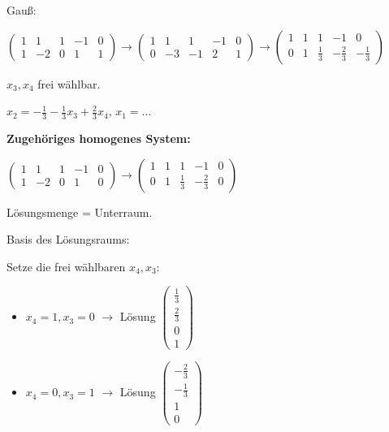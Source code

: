\documentclass[a4paper, openany]{book}
\begin{document}
    Gauß:


    \par \medskip

    $\begin{pmatrix}1 & 1 & 1 & -1 & 0 \\ 1 & -2 & 0 & 1 & 1 \end{pmatrix} \rightarrow \begin{pmatrix}1 & 1 & 1 & -1 & 0 \\ 0 & -3 & -1 & 2 & 1 \end{pmatrix} \rightarrow \begin{pmatrix}1 & 1 & 1 & -1 & 0 \\ 0 & 1 & \frac{1}{3} & - \frac{2}{3} & - \frac{1}{3} \end{pmatrix}$

    \par \medskip

    $x_3, x_4$ frei wählbar.

    $x_2 = - \frac{1}{3} - \frac{1}{3} x_3 + \frac{2}{3} x_4$, $x_1 = ...$

    \par \medskip

    \textbf{Zugehöriges homogenes System:}

    \par \medskip

    $\begin{pmatrix}1 & 1 & 1 & -1 & 0 \\ 1 & -2 & 0 & 1 & 0 \end{pmatrix} \rightarrow \begin{pmatrix}1 & 1 & 1 & -1 & 0 \\ 0 & 1 & \frac{1}{3} & - \frac{2}{3} & 0 \end{pmatrix}$

    \par \medskip

    Lösungsmenge = Unterraum.

    Basis des Lösungsraums:

    Setze die frei wählbaren $x_4, x_3:$

    \begin{itemize}
      \item $x_4 = 1, x_3 = 0$ $\rightarrow$ Lösung $\begin{pmatrix}\frac{1}{3} \\ \frac{2}{3} \\ 0 \\ 1 \end{pmatrix}$
      \item $x_4 = 0, x_3 = 1$ $\rightarrow$ Lösung $\begin{pmatrix}- \frac{2}{3} \\ - \frac{1}{3} \\ 1 \\ 0 \end{pmatrix}$
    \end{itemize}
\end{document}
